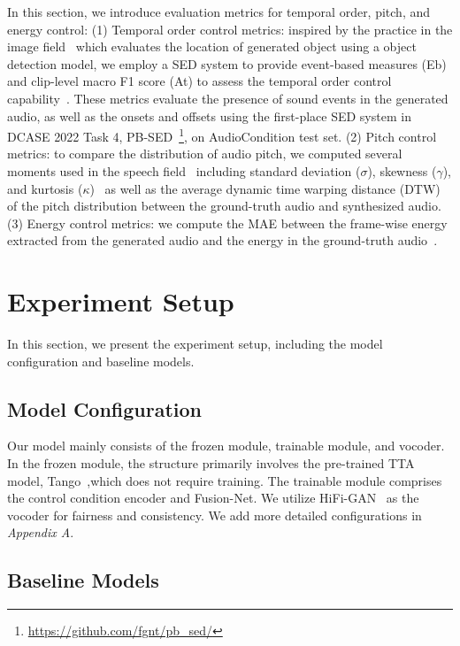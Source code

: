 \documentclass[letterpaper]{article}
\begin{document}
In this section, we introduce evaluation metrics for temporal order, pitch, and energy control: (1) Temporal order control metrics: inspired by the practice in the image field~\cite{li2023gligen,jahn2021highresolutioncs} which evaluates the location of generated object using a object detection model, we employ a SED system to provide event-based measures (Eb) and clip-level macro F1 score (At) to assess the temporal order control capability~\cite{mesaros2016eventf1}. These metrics evaluate the presence of sound events in the generated audio, as well as the onsets and offsets using the first-place SED system in DCASE 2022 Task 4, PB-SED~\cite{janek2022pssed,janek2020fbsedt,janek2021sased}\footnote{\url{https://github.com/fgnt/pb_sed/}}, on AudioCondition test set. (2) Pitch control metrics: to compare the distribution of audio pitch, we computed several moments used in the speech field~\cite{ren2021fastspeech2} including standard deviation ($\sigma$), skewness ($\gamma$), and kurtosis ($\kappa$)~\cite{bistra2014diffpitch,niebuhr2019measuringas} as well as the average dynamic time warping distance (DTW)~\cite{muller2007dtw} of the pitch distribution between the ground-truth audio and synthesized audio. (3) Energy control metrics: we compute the MAE between the frame-wise energy extracted from the generated audio and the energy in the ground-truth audio~\cite{ren2021fastspeech2}.

\section{Experiment Setup}

In this section, we present the experiment setup, including the model configuration and baseline models.

\subsection{Model Configuration}

Our model mainly consists of the frozen module, trainable module, and vocoder. In the frozen module, the structure primarily involves the pre-trained TTA model, Tango~\cite{ghosal2023tango},which does not require training. The trainable module comprises the control condition encoder and Fusion-Net. We utilize HiFi-GAN~\cite{kong2020hifigan} as the vocoder for fairness and consistency. We add more detailed configurations in \textit{Appendix A}.

\subsection{Baseline Models}
\end{document}
